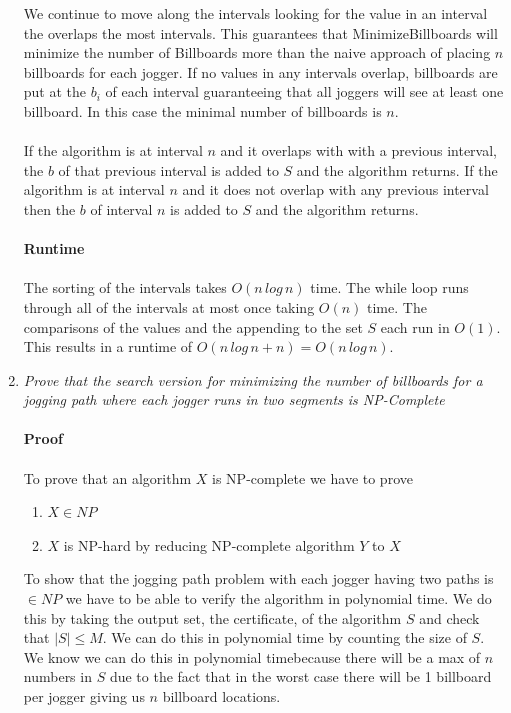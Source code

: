 \documentclass[12pt]{article}
\begin{document}
\begin{enumerate}
			We continue to move along the intervals looking for the value in an interval the overlaps the most intervals.  
			This guarantees that MinimizeBillboards will minimize the number of Billboards more than the naive approach of placing $n$ billboards for each jogger.
			If no values in any intervals overlap, billboards are put at the $b_i$ of each interval guaranteeing that all joggers will see at least one billboard.  
			In this case the minimal number of billboards is $n$.\\
			\\
			If the algorithm is at interval $n$ and it overlaps with with a previous interval, the $b$ of that previous interval is added to $S$ and the algorithm returns.
			If the algorithm is at interval $n$ and it does not overlap with any previous interval then the $b$ of interval $n$ is added to $S$ and the algorithm returns.\\
			\\
			\textbf{Runtime}\\
			\\
			The sorting of the intervals takes $O(n\,log\,n)$ time.  The while loop runs through all of the intervals at most once taking $O(n)$ time.  
			The comparisons of the values and the appending to the set $S$ each run in $O(1)$.  This results in a runtime of $O(n\,log\,n+n) = O(n\,log\,n)$.
	\newpage
	\item \textit{Prove that the search version for minimizing the number of billboards for a jogging path where each jogger runs in two segments is NP-Complete}\\
	\\
	\textbf{Proof}\\
	\\
	To prove that an algorithm $X$ is NP-complete we have to prove
		\begin{enumerate}
			\item $X \in NP$
			\item $X$ is NP-hard by reducing NP-complete algorithm $Y$ to $X$
		\end{enumerate}
	To show that the jogging path problem with each jogger having two paths is $\in NP$ we have to be able to verify the algorithm in polynomial time.
	We do this by taking the output set, the certificate, of the algorithm $S$ and check that $|S| \leq M$.  We can do this in polynomial time by counting the size of $S$.
	We know we can do this in polynomial timebecause there will be a max of $n$ numbers in $S$ due to the fact that in the worst case there will be 1 billboard per jogger giving us $n$ billboard locations.\\

\end{enumerate}
\end{document}
